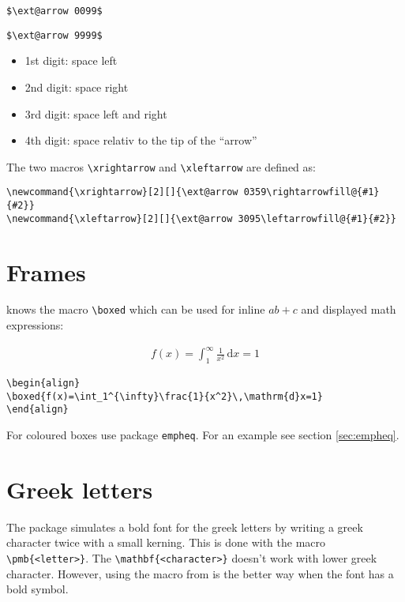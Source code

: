 \begin{table}[htb]
{\verb+$\ext@arrow 0099$+

\verb+$\ext@arrow 9999$+
}

\begin{itemize}
\item 1st digit: space left
\item 2nd digit: space right
\item 3rd digit: space left and right
\item 4th digit: space relativ to the tip of the ``arrow''
\end{itemize}

The two macros \verb+\xrightarrow+ and \verb+\xleftarrow+ are defined as:
\begin{lstlisting}
\newcommand{\xrightarrow}[2][]{\ext@arrow 0359\rightarrowfill@{#1}{#2}}
\newcommand{\xleftarrow}[2][]{\ext@arrow 3095\leftarrowfill@{#1}{#2}}
\end{lstlisting}



\section{Frames}\label{sec:ams-frames}
%
\AmSmath knows the macro \verb|\boxed| which can
be used for inline $a\boxed{b+c}$ and displayed math expressions:

\begin{align}
\boxed{f(x)=\int_1^{\infty}\frac{1}{x^2}\,\mathrm{d}x=1}
\end{align}

\begin{lstlisting}
\begin{align}
\boxed{f(x)=\int_1^{\infty}\frac{1}{x^2}\,\mathrm{d}x=1}
\end{align}
\end{lstlisting}

For coloured boxes use package \verb|empheq|. For an example see section \vref{sec:empheq}.

\section{Greek letters}\label{sec:greek-AMS}
%
The \AmSmath package simulates a bold font for the greek letters by writing a greek    %
character twice with a small kerning. This is done with the macro
\verb|\pmb{<letter>}|. The
\verb|\mathbf{<character>}| doesn't work with lower greek character. However,
using the  macro from \AmSmath{} is the better way when the font
has a bold symbol. 


\end{table}

